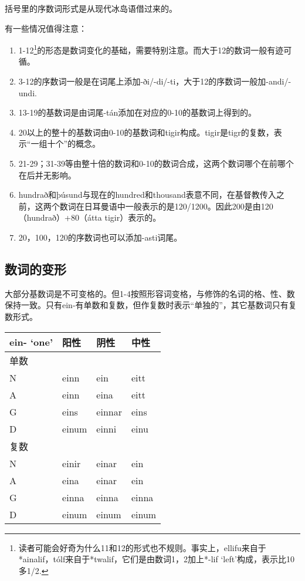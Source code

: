 括号里的序数词形式是从现代冰岛语借过来的。

有一些情况值得注意：

\begin{enumerate}
\def\labelenumi{\arabic{enumi})}
\item
  1-12\footnote{读者可能会好奇为什么11和12的形式也不规则。事实上，ellifu来自于*ainalif，tólf来自于*twalif，它们是由数词1，2加上*-lif
    `left'构成，表示比10多1/2.}的形态是数词变化的基础，需要特别注意。而大于12的数词一般有迹可循。
\item
  3-12的序数词一般是在词尾上添加-ði/-di/-ti，大于12的序数词一般加-andi/-undi.
\item
  13-19的基数词是由词尾-tán添加在对应的0-10的基数词上得到的。
\item
  20以上的整十的基数词由0-10的基数词和tigir构成。tigir是tigr的复数，表示``一组十个''的概念。
\item
  21-29；31-39等由整十倍的数词和0-10的数词合成，这两个数词哪个在前哪个在后并无影响。
\item
  hundrað和þúsund与现在的hundred和thousand表意不同，在基督教传入之前，这两个数词在日耳曼语中一般表示的是120/1200。因此200是由120（hundrað）+80（átta
  tigir）表示的。
\item
  20，100，120的序数词也可以添加-asti词尾。
\end{enumerate}

\subsection{数词的变形}\label{ux6570ux8bcdux7684ux53d8ux5f62}

大部分基数词是不可变格的。但1-4按照形容词变格，与修饰的名词的格、性、数保持一致。只有ein-有单数和复数，但作复数时表示``单独的''，其它基数词只有复数形式。

\begin{longtable}{llll}
\toprule
ein- `one‌' & 阳性 & 阴性 & 中性 \\
\midrule
\endhead
\bottomrule
\endfoot
单数 & & & \\
N & einn & ein & eitt \\
A & einn & eina & eitt \\
G & eins & einnar & eins \\
D & einum & einni & einu \\
复数 & & & \\
N & einir & einar & ein \\
A & eina & einar & ein \\
G & einna & einna & einna \\
D & einum & einum & einum \\
\end{longtable}

